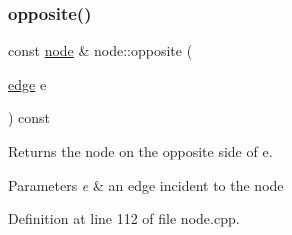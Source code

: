 \subsubsection{\texorpdfstring{opposite()}{opposite()}}
{\footnotesize\ttfamily const \mbox{\hyperlink{classnode}{node}} \& node\+::opposite (\begin{DoxyParamCaption}\item[{\mbox{\hyperlink{classedge}{edge}}}]{e }\end{DoxyParamCaption}) const}

Returns the node on the opposite side of {\ttfamily e}.


\begin{DoxyParams}{Parameters}
{\em e} & an edge incident to the node \\
\hline
\end{DoxyParams}


Definition at line 112 of file node.\+cpp.


